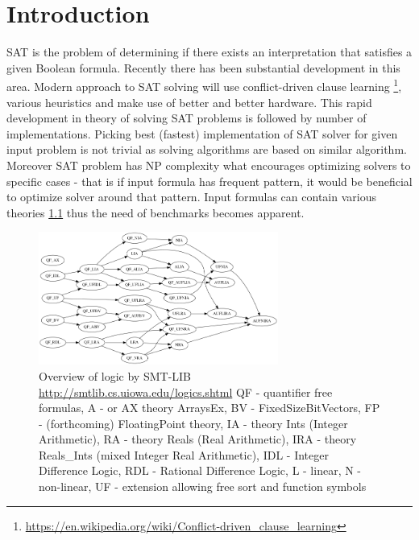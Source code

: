 \chapter{Introduction}
\label{cha:Introduction}

\gls{SAT} is the problem of determining if there exists an interpretation that satisfies a given Boolean formula. Recently there has been substantial development in this area. Modern approach to SAT solving will use conflict-driven clause learning \footnote{\url{https://en.wikipedia.org/wiki/Conflict-driven_clause_learning}}, various heuristics and make use of better and better hardware. This rapid development in theory of solving SAT problems is followed by number of implementations. Picking best (fastest) implementation of SAT solver for given input problem is not trivial as solving algorithms are based on similar algorithm. Moreover SAT problem has NP complexity what encourages optimizing solvers to specific cases - that is if input formula has frequent pattern, it would be beneficial to optimize solver around that pattern. Input formulas can contain various theories \ref{pic:logicOverview} thus the need of benchmarks becomes apparent.

\begin{figure}[h]
\begin{centering}
  \includegraphics[width=0.7\textwidth]{images/smt_lib_logics.png}
  \caption{Overview of logic by SMT-LIB \url{http://smtlib.cs.uiowa.edu/logics.shtml}
    \tiny{
    QF - quantifier free formulas,
    A - or AX theory ArraysEx,
    BV - FixedSizeBitVectors,
    FP - (forthcoming) FloatingPoint theory,
    IA - theory Ints (Integer Arithmetic),
    RA - theory Reals (Real Arithmetic),
    IRA - theory Reals\_Ints (mixed Integer Real Arithmetic),
    IDL - Integer Difference Logic,
    RDL - Rational Difference Logic,
    L - linear,
    N - non-linear,
    UF - extension allowing free sort and function symbols
  }}
  \label{pic:logicOverview}
\end{centering}
\end{figure}

